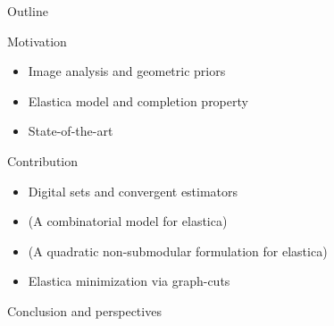 \begin{frame}
	{Outline}

\begin{enumerate}
	\item{Motivation}
	\begin{itemize}
		\item{Image analysis and geometric priors}
		\item{Elastica model and completion property}		
		\item{State-of-the-art}							
	\end{itemize}
      \vspace{1em}
	{
	\item{Contribution}
	\begin{itemize}
		\item{Digital sets and convergent estimators}		
		\item{(A combinatorial model for elastica)}
		\item{(A quadratic non-submodular formulation for elastica)}	
		\item{Elastica minimization via graph-cuts}	
	\end{itemize}}
	\vspace{1em}
	\item{Conclusion and perspectives}
\end{enumerate}
\end{frame}